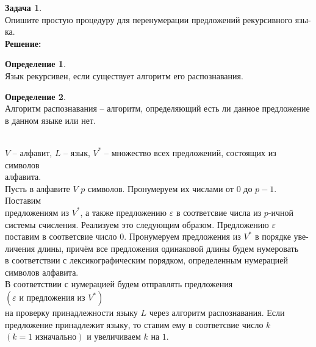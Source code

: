 \documentclass[a4paper,12pt]{article}
\theoremstyle{definition} %
\newtheorem{definition}{Определение}[section]
\theoremstyle{definition} %
\newtheorem{problem}{Задача}[section]
\theoremstyle{remark} %
\begin{document}
\begin{problem}\ \\[1ex]
	Опишите простую процедуру для перенумерации предложений	рекурсивного язы- \\[1ex]
	ка. \\[4ex]
	
	\textbf{Решение:}
	\begin{definition}\ \\[1ex]
		Язык рекурсивен, если существует алгоритм его распознавания.
	\end{definition}

	\begin{definition}\ \\[1ex]
		Алгоритм распознавания -- алгоритм, определяющий есть ли данное предложение \\[1ex]
		в данном языке или нет.
	\end{definition}\ \\[1ex]
		$V$ -- алфавит, $L$ -- язык, $V^{*}$ -- множество всех предложений, состоящих из символов \\[1ex]
		алфавита. \\[1ex]
		Пусть в алфавите $V$ $p$ символов. Пронумеруем их числами от $0$ до $p - 1$. Поставим \\[1ex] 
		предложениям из $V^{*}$, а также предложению $\varepsilon$ в соответсвие числа из $p$-ичной \\[1ex]
		системы счисления. Реализуем это следующим образом. Предложению $\varepsilon$ \\[1ex]
		поставим в соответсвие число $0$. Пронумеруем предложения из $V^{*}$ в порядке уве- \\[1ex]
		личения длины, причём все предложения одинаковой длины будем нумеровать \\[1ex]
		в соответствии с лексикографическим порядком, определенным нумерацией \\[1ex]
		символов алфавита. \\[1ex]
		В соответствии с нумерацией будем отправлять предложения $(\varepsilon \text{ и предложения из } V^{*})$ \\[1ex]
		на проверку принадлежности языку $L$ через алгоритм распознавания. Если \\[1ex]
		предложение принадлежит языку, то ставим ему в соответсвие число $k$ \\[1ex]
		$(k = 1 \text{ изначально})$ и увеличиваем $k$ на $1$. \\[4ex]	
\end{problem}
\end{document}
